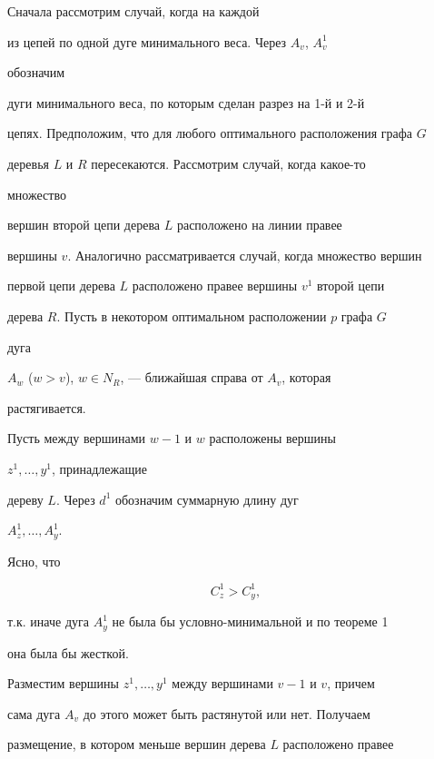 \begin{pf} Сначала рассмотрим случай, когда на каждой


из цепей по одной дуге минимального веса. Через $A_v$, $A^1_v$


обозначим


дуги минимального веса, по которым сделан разрез на 1-й и 2-й


цепях. Предположим, что для любого оптимального расположения графа $G$


деревья $L$ и $R$ пересекаются. Рассмотрим случай, когда какое-то


множество


вершин второй цепи дерева $L$ расположено на линии правее


вершины $v$. Аналогично рассматривается случай, когда множество вершин


первой цепи дерева $L$ расположено правее вершины $v^1$ второй цепи


дерева $R$. Пусть в некотором оптимальном расположении $p$ графа $G$


дуга


$A_w$ ($w>v$), $w\in N_R$, --- ближайшая справа от $A_v$, которая


растягивается.


Пусть между вершинами $w-1$ и $w$ расположены вершины


$z^1,\dotsc,y^1$, принадлежащие


дереву $L$. Через $d^1$ обозначим суммарную длину дуг


$A^1_z,\dotsc,A^1_y$.





Ясно, что


\begin{equation}


C^1_z >C^1_y,


\end{equation}


т.к. иначе дуга $A^1_y$ не была бы условно-минимальной и по теореме 1


она была бы жесткой.





Разместим вершины $z^1,\dotsc,y^1$ между вершинами $v-1$ и $v$, причем


сама дуга $A_v$ до этого может быть растянутой или нет. Получаем


размещение, в котором меньше вершин дерева $L$ расположено правее



\end{pf}

